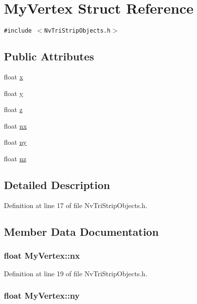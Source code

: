 \hypertarget{struct_my_vertex}{
\section{MyVertex Struct Reference}
\label{struct_my_vertex}
}
{\tt \#include $<$NvTriStripObjects.h$>$}

\subsection*{Public Attributes}
\begin{CompactItemize}
\item 
float \hyperlink{struct_my_vertex_e0b950f1d1062d8234a207d8237b4a89}{x}
\item 
float \hyperlink{struct_my_vertex_8a39d11e87aca9849e57a5b259c1b7bf}{y}
\item 
float \hyperlink{struct_my_vertex_3577ad7fec9b13a0de8722808f5e1802}{z}
\item 
float \hyperlink{struct_my_vertex_876875025e2f272a94d08f3dfaf0c373}{nx}
\item 
float \hyperlink{struct_my_vertex_d4796c7fbaff338e788d4c3f5f4bbf0a}{ny}
\item 
float \hyperlink{struct_my_vertex_a0d4be6347754bcb5074ddd310afb988}{nz}
\end{CompactItemize}


\subsection{Detailed Description}


Definition at line 17 of file NvTriStripObjects.h.

\subsection{Member Data Documentation}
\hypertarget{struct_my_vertex_876875025e2f272a94d08f3dfaf0c373}{
\subsubsection[{nx}]{\setlength{\rightskip}{0pt plus 5cm}float {\bf MyVertex::nx}}}
\label{struct_my_vertex_876875025e2f272a94d08f3dfaf0c373}




Definition at line 19 of file NvTriStripObjects.h.\hypertarget{struct_my_vertex_d4796c7fbaff338e788d4c3f5f4bbf0a}{
\subsubsection[{ny}]{\setlength{\rightskip}{0pt plus 5cm}float {\bf MyVertex::ny}}}
\label{struct_my_vertex_d4796c7fbaff338e788d4c3f5f4bbf0a}




